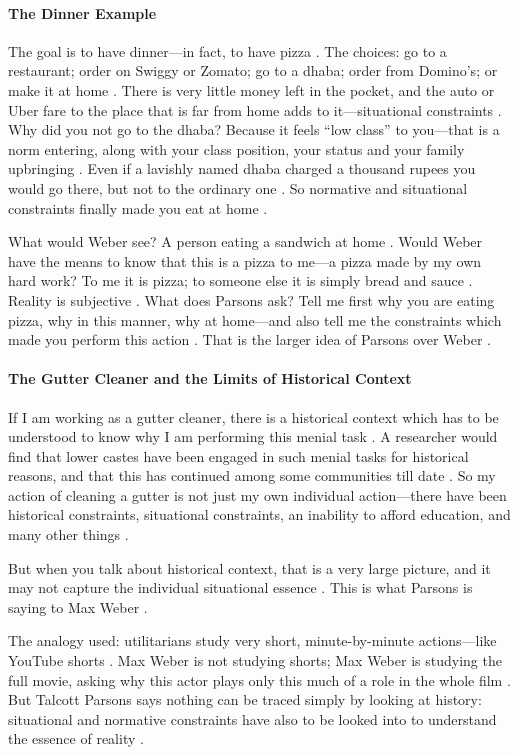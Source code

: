 \paragraph{The Dinner Example}
The goal is to have dinner---in fact, to have pizza . The choices: go to a restaurant; order on Swiggy or Zomato; go to a dhaba; order from Domino's; or make it at home .
There is very little money left in the pocket, and the auto or Uber fare to the place that is far from home adds to it---situational constraints .
Why did you not go to the dhaba? Because it feels ``low class'' to you---that is a norm entering, along with your class position, your status and your family upbringing . Even if a lavishly named dhaba charged a thousand rupees you would go there, but not to the ordinary one .
So normative and situational constraints finally made you eat at home .

\begin{ComparisonBox}
What would Weber see? A person eating a sandwich at home . Would Weber have the means to know that this is a pizza to me---a pizza made by my own hard work? To me it is pizza; to someone else it is simply bread and sauce . Reality is subjective .
What does Parsons ask? Tell me first why you are eating pizza, why in this manner, why at home---and also tell me the constraints which made you perform this action . That is the larger idea of Parsons over Weber .
\end{ComparisonBox}

\paragraph{The Gutter Cleaner and the Limits of Historical Context}
If I am working as a gutter cleaner, there is a historical context which has to be understood to know why I am performing this menial task . A researcher would find that lower castes have been engaged in such menial tasks for historical reasons, and that this has continued among some communities till date .
So my action of cleaning a gutter is not just my own individual action---there have been historical constraints, situational constraints, an inability to afford education, and many other things .

But when you talk about historical context, that is a very large picture, and it may not capture the individual situational essence . This is what Parsons is saying to Max Weber .

\begin{ComparisonBox}
The analogy used: utilitarians study very short, minute-by-minute actions---like YouTube shorts .
Max Weber is not studying shorts; Max Weber is studying the full movie, asking why this actor plays only this much of a role in the whole film .
But Talcott Parsons says nothing can be traced simply by looking at history: situational and normative constraints have also to be looked into to understand the essence of reality .
\end{ComparisonBox}

